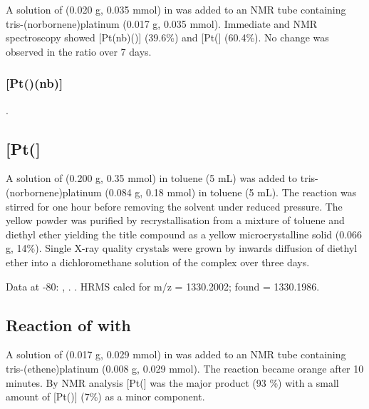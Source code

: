 A solution of \Phthixantphos{} (0.020 g, 0.035 mmol) in  was added to an NMR tube containing tris-(norbornene)platinum (0.017 g, 0.035 mmol).  Immediate \proton{} and \phosphorus{} NMR spectroscopy showed [Pt(nb)(\Phthixantphos)] (39.6\%) and [Pt(\Phthixantphos{}] (60.4\%).  No change was observed in the ratio over 7 days.   

\subsubsection{[Pt(\Phthixantphos)(nb)]}

.

\subsection*{\texorpdfstring{[Pt(\Phthixantphos{}]} P}

A solution of \Phthixantphos{} (0.200 g, 0.35 mmol) in toluene (5 mL) was added to tris-(norbornene)platinum (0.084 g, 0.18 mmol) in toluene (5 mL).  The reaction was stirred for one hour before removing the solvent under reduced pressure.  The yellow powder was purified by recrystallisation from a mixture of toluene and diethyl ether yielding the title compound as a yellow microcrystalline solid (0.066 g, 14\%).  Single X-ray quality crystals were grown by inwards diffusion of diethyl ether into a dichloromethane solution of the complex over three days.  


Data at -80\degC:
,
.
.
HRMS calcd for  m/z = 1330.2002; found = 1330.1986.

\subsection*{Reaction of \Phthixantphos{} with \texorpdfstring{\ce{[Pt(C2H4)3]}} P}

A solution of \PhThixantphos{} (0.017 g, 0.029 mmol) in  was added to an NMR tube containing tris-(ethene)platinum (0.008 g, 0.029 mmol).  The reaction became orange after 10 minutes.  By \phosphorus{} NMR analysis [Pt(\Phthixantphos{}] was the major product (93 \%) with a small amount of [Pt(\Phthixantphos)] (7\%) as a minor component.  

